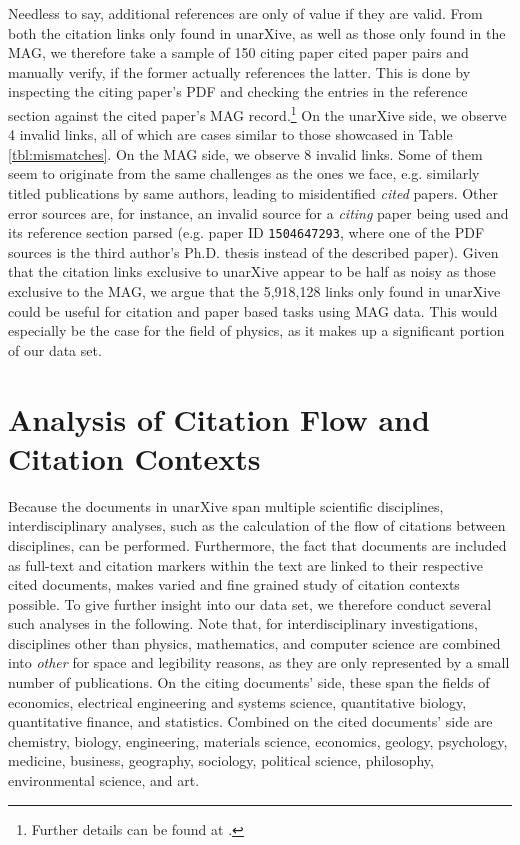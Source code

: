 Needless to say, additional references are only of value if they are valid. From both the citation links only found in unarXive, as well as those only found in the MAG, we therefore take a sample of 150 citing paper cited paper pairs and manually verify, if the former actually references the latter. This is done by inspecting the citing paper's PDF and checking the entries in the reference section against the cited paper's MAG record.\footnote{Further details can be found at .} On the unarXive side, we observe 4 invalid links, all of which are cases similar to those showcased in Table \ref{tbl:mismatches}. On the MAG side, we observe 8 invalid links. Some of them seem to originate from the same challenges as the ones we face, e.g. similarly titled publications by same authors, leading to misidentified \emph{cited} papers. Other error sources are, for instance, an invalid source for a \emph{citing} paper being used and its reference section parsed (e.g. paper ID \texttt{1504647293}, where one of the PDF sources is the third author's Ph.D. thesis instead of the described paper). Given that the citation links exclusive to unarXive appear to be half as noisy as those exclusive to the  MAG, we argue that the 5,918,128 links only found in unarXive could be useful for citation and paper based tasks using MAG data. This would especially be the case for the field of physics, as it makes up a significant portion of our data set.

\section{Analysis of Citation Flow and Citation Contexts}
\label{sec:analysis}

Because the documents in unarXive span multiple scientific disciplines, interdisciplinary analyses, such as the calculation of the flow of citations between disciplines, can be performed. Furthermore, the fact that documents are included as full-text and citation markers within the text are linked to their respective cited documents, makes varied and fine grained study of citation contexts possible. To give further insight into our data set, we therefore conduct several such analyses in the following. Note that, for interdisciplinary investigations, disciplines other than physics, mathematics, and computer science are combined into \emph{other} for space and legibility reasons, as they are only represented by a small number of publications. On the citing documents' side, these span the fields of economics, electrical engineering and systems science, quantitative biology, quantitative finance, and statistics. Combined on the cited documents' side are chemistry, biology, engineering, materials science, economics, geology, psychology, medicine, business, geography, sociology, political science, philosophy, environmental science, and art.

